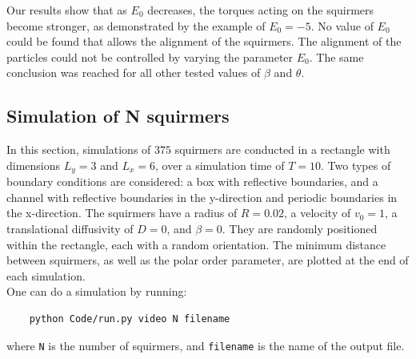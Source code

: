 \documentclass{article}
\begin{document}
Our results show that as $E_0$ decreases, the torques acting on the squirmers become stronger, as 
demonstrated by the example of $E_0 = -5$. 
No value of $E_0$
could be found that allows the alignment of the squirmers. The alignment of the particles 
could not be controlled by varying the parameter $E_0$. The same conclusion was reached for all other tested values of $\beta$
and $\theta$.

\subsection{Simulation of N squirmers}
In this section, simulations of $375$ squirmers are conducted in a rectangle with dimensions $L_y = 3$ and $L_x=6$, over 
a simulation time of $T=10$. Two types of boundary conditions are considered: a box with reflective boundaries, 
and a channel with reflective boundaries in the y-direction and periodic boundaries in the x-direction.
The squirmers have a radius of $R = 0.02$, a velocity of $v_0 = 1$, a translational diffusivity of $D=0$, and $\beta = 0$.
 They are randomly positioned within the rectangle, each with a random orientation. The minimum distance between 
 squirmers, as well as the polar order parameter, are plotted at the end of each simulation.\\
One can do a simulation by running:
\begin{verbatim}
    python Code/run.py video N filename
\end{verbatim} 
where \texttt{N} is the number of squirmers, and \texttt{filename} is the name of the output file.
\end{document}
